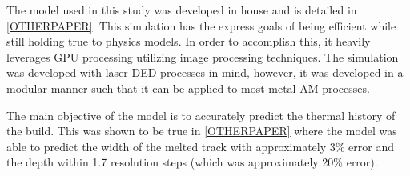 \label{model_description}

The model used in this study was developed in house and is detailed in \ref{OTHERPAPER}.
This simulation has the express goals of being efficient while still holding true to physics models.  In order to accomplish this, it heavily leverages GPU processing utilizing image processing techniques.  The simulation was developed with laser \ac{DED} processes in mind, however, it was developed in a modular manner such that it can be applied to most metal \ac{AM} processes.  

The main objective of the model is to accurately predict the thermal history of the build.  This was shown to be true in \ref{OTHERPAPER} where the model was able to predict the width of the melted track with approximately 3\% error and the depth within 1.7 resolution steps (which was approximately 20\% error).